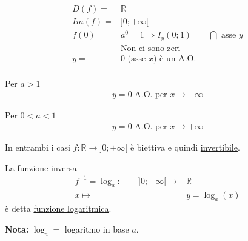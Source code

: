 \documentclass[../main.tex]{subfiles}
\begin{document}
\begin{align*}
    D(f) =& \mathbb{R} \\
    Im(f) =& ] 0;+\infty[  \\
    f(0) =& a^0 = 1 \Rightarrow I_y(0;1) \phantom{--} \bigcap \text{ asse } y \\
    &\text{Non ci sono zeri} \\
    y =& 0 \text{ (asse $x$) è un A.O.} \\
\end{align*}

Per $a > 1$
\begin{align*}
    y = 0 \text{ A.O. per } x\rightarrow -\infty
\end{align*}

Per $0 < a < 1$
\begin{align*}
    y = 0 \text{ A.O. per } x\rightarrow +\infty
\end{align*}

In entrambi i casi $f:\mathbb{R} \longrightarrow ]0;+\infty [$ è biettiva e quindi \underline{invertibile}.

\pagebreak
La funzione inversa
\begin{align*}
    f^{-1} = \log_a : \phantom{--}]0 ; + \infty [ \longrightarrow& \mathbb{R} \\
    x \longmapsto& y = \log_a(x)
\end{align*}
è detta \underline{funzione logaritmica}.

\textbf{Nota:} $\log_a = $ logaritmo in base $a$.
\end{document}
